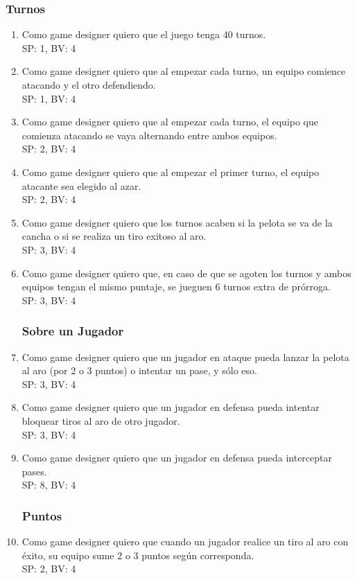 \documentclass[a4paper, 10pt, twoside]{article}
\begin{document}
\subsubsection{Turnos}
\begin{enumerate}
    \item Como game designer quiero que el juego tenga 40 turnos.
    \\SP: 1, BV: 4
    \item Como game designer quiero que al empezar cada turno, un equipo comience atacando y el otro defendiendo.
    \\SP: 1, BV: 4
    \item Como game designer quiero que al empezar cada turno, el equipo que comienza atacando se vaya alternando entre ambos equipos.
    \\SP: 2, BV: 4
    \item Como game designer quiero que al empezar el primer turno, el equipo atacante sea elegido al azar.
    \\SP: 2, BV: 4
    \item Como game designer quiero que los turnos acaben si la pelota se va de la cancha o si se realiza un tiro exitoso al aro.
    \\SP: 3, BV: 4
    \item Como game designer quiero que, en caso de que se agoten los turnos y ambos equipos tengan el mismo puntaje, se jueguen 6 turnos extra de pr\'orroga.
	\\SP: 3, BV: 4
\subsubsection{Sobre un Jugador}
    \item Como game designer quiero que un jugador en ataque pueda lanzar la pelota al aro (por 2 o 3 puntos) o intentar un pase, y s\'olo eso.
    \\SP: 3, BV: 4
    \item Como game designer quiero que un jugador en defensa pueda intentar bloquear tiros al aro de otro jugador. 
     \\SP: 3, BV: 4
    \item Como game designer quiero que un jugador en defensa pueda interceptar pases.
    \\SP: 8, BV: 4
    \subsubsection{Puntos}
        \item Como game designer quiero que cuando un jugador realice un tiro al aro con \'exito, su equipo sume 2 o 3 puntos seg\'un corresponda.
    \\SP: 2, BV: 4

\end{enumerate}
\end{document}
